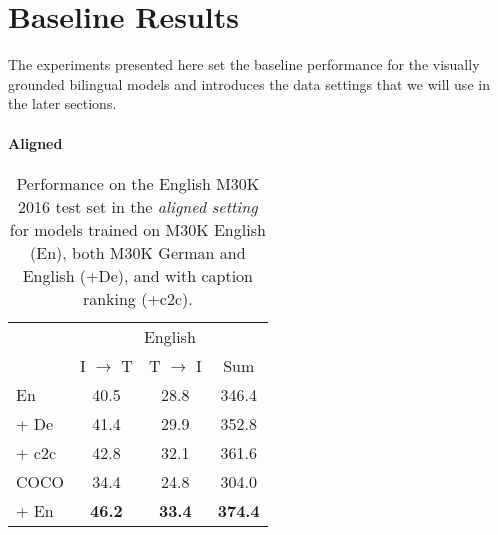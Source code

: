 \section{Baseline Results}\label{sec:results}

The experiments presented here set the baseline performance 
for the visually grounded bilingual models
and introduces the data settings that we will use in the 
later sections.

\paragraph{Aligned}

\begin{table}[t]
    \centering
    \renewcommand{\arraystretch}{1.0}
    \begin{tabular}{lccc}
        \toprule
         & \multicolumn{3}{c}{English}\\
         \cmidrule(lr){2-4}
         & I $\rightarrow$ T & T $\rightarrow$ I & Sum\\
         \midrule
         En & 40.5 & 28.8 & 346.4 \\
         \; + De & 41.4 & 29.9  & 352.8\\
         \; \; + c2c & 42.8  & 32.1 & 361.6\\
         COCO & 34.4 & 24.8 & 304.0 \\
         \; + En & \textbf{46.2} & \textbf{33.4} & \textbf{374.4}\\
         \bottomrule
    \end{tabular}
    \caption{Performance on the English
    M30K 2016 test set in the \emph{aligned setting} for models trained on 
    M30K English (En), both M30K German and English (+De), 
    and with caption ranking (+c2c).}
    \label{tab:engbaseline}
\end{table}



